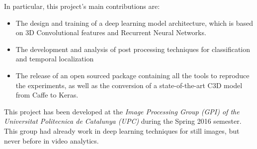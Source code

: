 In particular, this project's main contributions are:
\begin{itemize}
	\item The design and training of a deep learning model architecture, which is based on 3D Convolutional features and Recurrent Neural Networks.
    \item The development and analysis of post processing techniques for classification and temporal localization
    \item The release of an open sourced package containing all the tools to reproduce the experiments, as well as the conversion of a state-of-the-art C3D model from Caffe to Keras.
    
\end{itemize}


This project has been developed at the \textit{Image Processing Group (GPI) of the Universitat Politecnica de Catalunya (UPC)} during the Spring 2016 semester. This group had already work in deep learning techniques for still images, but never before in video analytics. %

